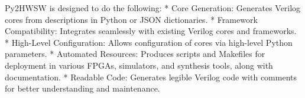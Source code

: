 Py2HWSW is designed to do the following:
* Core Generation: Generates Verilog cores from descriptions in Python or JSON dictionaries.
* Framework Compatibility: Integrates seamlessly with existing Verilog cores and frameworks.
* High-Level Configuration: Allows configuration of cores via high-level Python parameters.
* Automated Resources: Produces scripts and Makefiles for deployment in various FPGAs, simulators, and synthesis tools, along with documentation.
* Readable Code: Generates legible Verilog code with comments for better understanding and maintenance.
